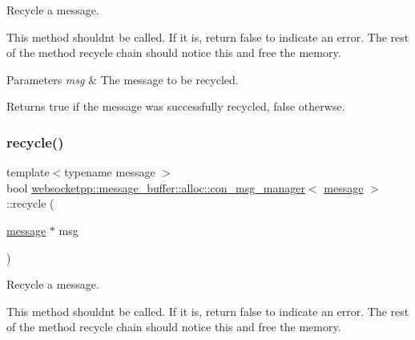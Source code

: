 Recycle a message. 

This method shouldn\textquotesingle{}t be called. If it is, return false to indicate an error. The rest of the method recycle chain should notice this and free the memory.


\begin{DoxyParams}{Parameters}
{\em msg} & The message to be recycled.\\
\hline
\end{DoxyParams}
\begin{DoxyReturn}{Returns}
true if the message was successfully recycled, false otherwse. 
\end{DoxyReturn}
\mbox{\label{classwebsocketpp_1_1message__buffer_1_1alloc_1_1con__msg__manager_a4e1013bc89944fbfd222b9ab6ad76712}} 
\subsubsection{\texorpdfstring{recycle()}{recycle()}\hspace{0.1cm}{\footnotesize\ttfamily [2/2]}}
{\footnotesize\ttfamily template$<$typename message $>$ \\
bool \mbox{\hyperlink{classwebsocketpp_1_1message__buffer_1_1alloc_1_1con__msg__manager}{websocketpp\+::message\+\_\+buffer\+::alloc\+::con\+\_\+msg\+\_\+manager}}$<$ \mbox{\hyperlink{classwebsocketpp_1_1message__buffer_1_1message}{message}} $>$\+::recycle (\begin{DoxyParamCaption}\item[{\mbox{\hyperlink{classwebsocketpp_1_1message__buffer_1_1message}{message}} $\ast$}]{msg }\end{DoxyParamCaption})\hspace{0.3cm}{\ttfamily [inline]}}



Recycle a message. 

This method shouldn\textquotesingle{}t be called. If it is, return false to indicate an error. The rest of the method recycle chain should notice this and free the memory.


